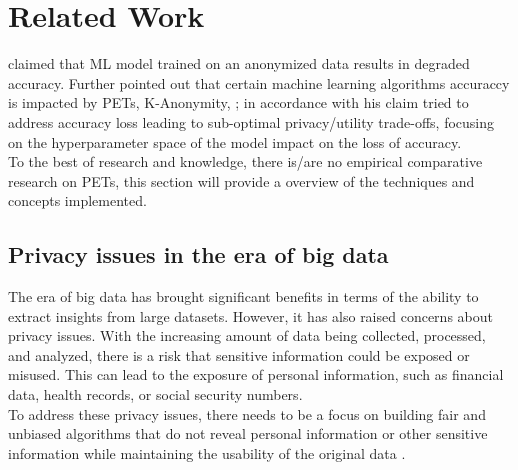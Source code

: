 \section{Related Work}
\label{sec:related_work}
\cite{goldsteen2022anonymizing,wimmer2014comparison} claimed that ML model trained on an anonymized data results in degraded accuracy. Further \cite{wimmer2014comparison} pointed out that certain  machine  learning  algorithms accuraccy is impacted by PETs, K-Anonymity, ; in accordance with his claim
 \cite{arous2023exploring} tried to address accuracy loss leading to sub-optimal  privacy/utility  trade-offs, focusing on the hyperparameter space of the model impact on the loss of accuracy.\\ To the best of research and knowledge, there is/are no empirical comparative research on PETs, this section will provide a overview of the techniques and concepts implemented.
\subsection{Privacy issues in the era of big data}
The era of big data has brought significant benefits in terms of the ability to extract insights from large datasets\cite{zhang2019brief}. However, it has also raised concerns about privacy issues\cite{liu2019k}. With the increasing amount of data being collected, processed, and analyzed, there is a risk that sensitive information could be exposed or misused. This can lead to the exposure of personal information, such as financial data, health records, or social security numbers\cite{murthy2019comparative}.\\
To address these privacy issues, there needs to be a focus on building fair and unbiased algorithms that do not reveal personal information or other sensitive information while maintaining the usability of the original data\cite{murthy2019comparative,sweeney2002k} .
